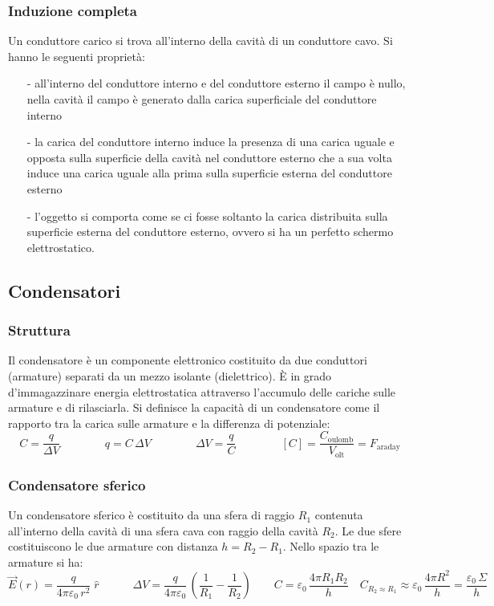 \documentclass[a4paper]{article}
\begin{document}
\subsubsection*{Induzione completa}
Un conduttore carico si trova all'interno della cavità di un conduttore cavo. Si hanno le seguenti proprietà:
\begin{itemize}[topsep=3pt, itemsep=0pt]
	\item[-] all'interno del conduttore interno e del conduttore esterno il campo è nullo, nella cavità il campo è generato dalla
	carica superficiale del conduttore interno
	\item[-] la carica del conduttore interno induce la presenza di una carica uguale e opposta sulla superficie della cavità nel
	conduttore esterno che a sua volta induce una carica uguale alla prima sulla superficie esterna del conduttore esterno
	\item[-] l'oggetto si comporta come se ci fosse soltanto la carica distribuita sulla superficie esterna del conduttore esterno,
	ovvero si ha un perfetto schermo elettrostatico.
\end{itemize}

\newpage

\subsection{Condensatori}
\subsubsection*{Struttura}
Il condensatore è un componente elettronico costituito da due conduttori (armature) separati da un mezzo isolante (dielettrico).
È in grado d'immagazzinare energia elettrostatica attraverso l'accumulo delle cariche sulle armature e di rilasciarla. Si
definisce la capacità di un condensatore come il rapporto tra la carica sulle armature e la differenza di potenziale:
\[C = \frac{q}{\Delta V} \qquad \qquad q = C \, \Delta V \qquad \qquad \Delta V = \frac{q}{C} \qquad \qquad [C] = \frac{C_\text{oulomb}}{V_\text{olt}} = F_\text{araday}\]

\subsubsection*{Condensatore sferico}
Un condensatore sferico è costituito da una sfera di raggio \(R_1\) contenuta all'interno della cavità di una sfera cava con raggio
della cavità \(R_2\). Le due sfere costituiscono le due armature con distanza \(h = R_2 - R_1\). Nello spazio tra le armature si ha:
\[\vec{E}(r) = \frac{q}{4 \pi \varepsilon_0 \, r^2} \; \hat{r} \qquad \quad \Delta V = \frac{q}{4 \pi \varepsilon_0} \, \left(\frac{1}{R_1} - \frac{1}{R_2}\right) \qquad C = \varepsilon_0 \, \frac{4 \pi R_1 R_2}{h} \quad C_{R_2 \approx R_1} \approx \varepsilon_0 \, \frac{4 \pi R^2}{h} = \frac{\varepsilon_0 \, \Sigma}{h}\]
\end{document}

